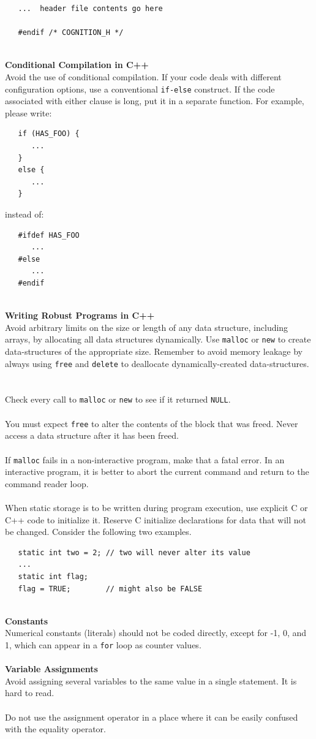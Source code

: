 \documentclass{CSSRforAfrica}
\newcommand{\blank}{~\\}
\begin{document}
\begin{appendices}
{\begin{verbatim}
   ...  header file contents go here

   #endif /* COGNITION_H */
\end{verbatim}
}
\blank
{\bf Conditional Compilation in C++}\\
Avoid the use of conditional compilation.  If your code deals with different configuration
options, use a conventional {\small \verb+if-else+} construct.  If the code associated
with either clause is long, put it in a separate function.  For example, please write:
{\small
\begin{verbatim}
   if (HAS_FOO) {
      ...
   }
   else {
      ...
   } 
\end{verbatim}
}
instead of:
{\small
\begin{verbatim}
   #ifdef HAS_FOO
      ...
   #else
      ...
   #endif
\end{verbatim}
} 
\blank
{\bf Writing Robust Programs in C++}\\
Avoid arbitrary limits on the size or length of any data structure, 
including arrays, by allocating all data structures dynamically.
Use {\small \verb+malloc+} or  {\small \verb+new+} to create data-structures of the 
appropriate size.  Remember to avoid memory leakage by always using {\small \verb+free+}
and {\small \verb+delete+} to deallocate dynamically-created data-structures.
\blank
~
\blank
Check every call to {\small \verb+malloc+} or {\small \verb+new+} to see if it returned
{\small \verb+NULL+}.
\blank
~
\blank
You must expect {\small \verb+free+} to alter the contents of the block that was freed.
Never access a data structure after it has been freed.
\blank
~
\blank
If {\small \verb+malloc+} fails in a non-interactive program, make that a fatal error.
In an interactive program, it is better to abort the current command and 
return to the command reader loop.
\blank
~
\blank
When static storage is to be written during program execution, use explicit C or C++
code to initialize it.   Reserve C initialize declarations for data that will not be
changed.  Consider the following two examples. 
{\small
\begin{verbatim}
   static int two = 2; // two will never alter its value
   ...
   static int flag;
   flag = TRUE;        // might also be FALSE
\end{verbatim}
} 
\blank
{\bf Constants}\\ 
Numerical constants (literals) should not be coded directly, except for -1, 0, and 1, which can
appear in a {\small \verb+for+} loop as counter values.
\blank
~
\blank
{\bf Variable Assignments}\\
Avoid assigning several variables to the same value in a single statement. It is hard to read.
\blank
~
\blank
Do not use the assignment operator in a place where it can be easily confused with the equality
operator.  


\end{appendices}
\end{document}
